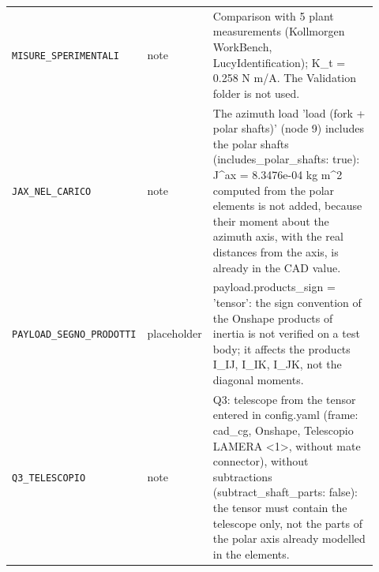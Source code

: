 \documentclass[10pt,a4paper]{article}
\numberwithin{equation}{section}
\begin{document}
\begin{longtable}{p{0.31\linewidth}p{0.12\linewidth}p{0.49\linewidth}}
\texttt{MISURE\_SPERIMENTALI} & note & Comparison with 5 plant measurements (Kollmorgen WorkBench, LucyIdentification); K\_t = 0.258 N m/A. The Validation folder is not used. \\
\texttt{JAX\_NEL\_CARICO} & note & The azimuth load 'load (fork + polar shafts)' (node 9) includes the polar shafts (includes\_polar\_shafts: true): J\^{}ax = 8.3476e-04 kg m\^{}2 computed from the polar elements is not added, because their moment about the azimuth axis, with the real distances from the axis, is already in the CAD value. \\
\texttt{PAYLOAD\_SEGNO\_PRODOTTI} & placeholder & payload.products\_sign = 'tensor': the sign convention of the Onshape products of inertia is not verified on a test body; it affects the products I\_IJ, I\_IK, I\_JK, not the diagonal moments. \\
\texttt{Q3\_TELESCOPIO} & note & Q3: telescope from the tensor entered in config.yaml (frame: cad\_cg, Onshape, Telescopio LAMERA <1>, without mate connector), without subtractions (subtract\_shaft\_parts: false): the tensor must contain the telescope only, not the parts of the polar axis already modelled in the elements. \\
\bottomrule\end{longtable}
\end{document}
